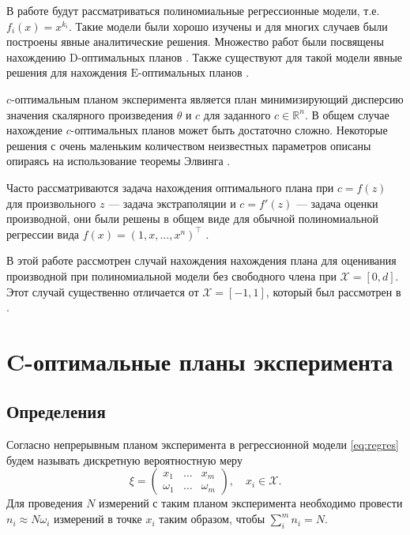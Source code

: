 \documentclass[specialist,
               substylefile = spbu.rtx,
               subf,href,colorlinks=true, 12pt]{disser}
\theoremstyle{definition}
\begin{document}
  В работе будут рассматриваться полиномиальные регрессионные модели, т.е. $f_i(x) = x^{k_i}$. Такие модели были хорошо изучены и для многих случаев были построены явные аналитические решения. Множество работ были посвящены нахождению $\mathrm{D}$-оптимальных планов \cite{hoel1958, studden1980, dette1990, dette2001}. Также существуют для такой модели явные решения для нахождения $\mathrm{E}$-оптимальных планов \cite{pukelsheim1993, dette1993, heiligers1994, dette1993_2}.
  
  $c$-оптимальным планом эксперимента является план минимизирующий дисперсию значения скалярного произведения $\theta$ и $c$ для заданного $c \in \mathbb{R}^n$. В общем случае нахождение $c$-оптимальных планов может быть достаточно сложно. Некоторые решения с очень маленьким количеством неизвестных параметров описаны опираясь на использование теоремы Элвинга \cite{elfving1952}. 
  
  Часто рассматриваются задача нахождения оптимального плана при $c = f(z)$ для произвольного $z$ --- задача экстраполяции и $c = f'(z)$ --- задача оценки производной, они были решены в общем виде для обычной полиномиальной регрессии вида $f(x) = (1, x, \ldots, x^n)^\top$ \cite{hoel1964, melas2010}. 
  
  В этой работе рассмотрен случай нахождения нахождения плана для оценивания производной при полиномиальной модели без свободного члена при $\mathcal{X} = [0, d]$. Этот случай существенно отличается от $\mathcal{X} = [-1, 1]$, который был рассмотрен в \cite{melasmain}. 
  
  
  

\chapter{C-оптимальные планы эксперимента}

\section{Определения}

Согласно \cite{kiefer1974} непрерывным планом эксперимента в регрессионной модели \eqref{eq:regres} будем называть дискретную вероятностную меру
  \begin{equation*}
    \xi = 
      \begin{pmatrix}
        x_1 & \ldots & x_m \\
        \omega_1 & \ldots & \omega_m
      \end{pmatrix}, \quad x_i \in \mathcal{X}.
  \end{equation*}
  Для проведения $N$ измерений с таким планом эксперимента необходимо провести $n_i \approx N \omega_i$ измерений в точке $x_i$ таким образом, чтобы $\sum^m_i n_i = N$.
\end{document}
